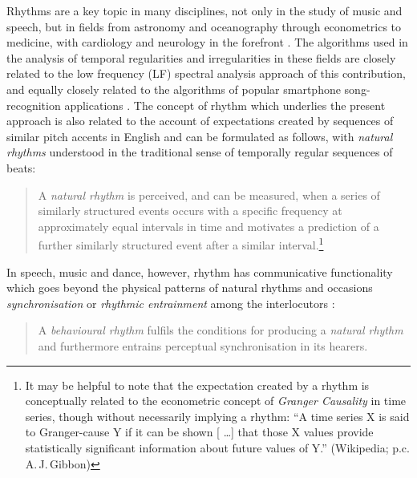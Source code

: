 \documentclass[output=paper,colorlinks,citecolor=brown]{langscibook}
\begin{document}
Rhythms are a key topic in many disciplines, not only in the study of music and speech, but in fields from astronomy and oceanography through econometrics to medicine, with cardiology and neurology in the forefront \citep{lewalterluederitz2010, huangetal1998}. The algorithms used in the analysis of temporal regularities and irregularities in these fields are closely related to the low frequency (LF) spectral analysis approach of this contribution, and equally closely related to the algorithms of popular smartphone song-recognition applications \citep{wangshazam2003}. The concept of rhythm which underlies the present approach is also related to the account of expectations created by sequences of similar pitch accents in English \citep{dilley2005} and can be formulated as follows, with \textit{natural rhythms} understood in the traditional sense of temporally regular sequences of beats:

\begin{quotation}
\noindent A \textit{natural rhythm} is perceived, and can be measured, when a series of similarly structured events occurs with a specific frequency at approximately equal intervals in time and motivates a prediction of a further similarly structured event after a similar interval.\footnote{It may be helpful to note that the expectation created by a rhythm is conceptually related to the econometric concept of \textit{Granger Causality} in time series, though without necessarily implying a rhythm: ``A time series X is said to Granger-cause Y if it can be shown [ \ldots ] that those X values provide statistically significant information about future values of Y.'' (Wikipedia; p.c. A.\,J.\,Gibbon)}
\end{quotation}

In speech, music and dance, however, rhythm has communicative functionality which goes beyond the physical patterns of natural rhythms and occasions \textit{synchronisation} or \textit{rhythmic entrainment} among the interlocutors \citep{cumminsport1998, indenmaliszwagnerwachsmuth2012, rathckeetaltapping2021}:

\begin{quotation}
\noindent A \textit{behavioural rhythm} fulfils the conditions for producing a \textit{natural rhythm} and furthermore entrains perceptual synchronisation in its hearers.
\end{quotation}
\end{document}
